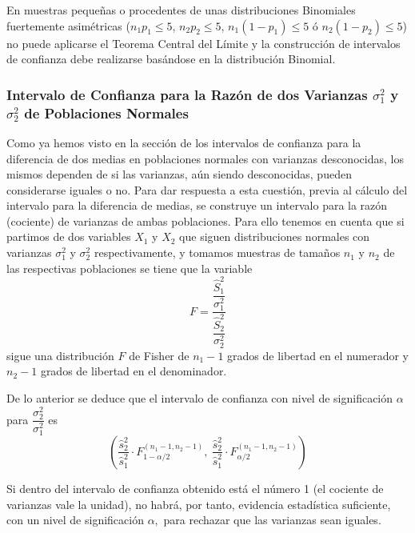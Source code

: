 En muestras pequeñas o procedentes de unas distribuciones Binomiales fuertemente asimétricas ($n_1p_1\leq 5$, $n_2p_2\leq
5$, $n_1(1-p_1)\leq 5$ ó $n_2(1-p_2)\leq 5$) no puede aplicarse el Teorema Central del Límite y la construcción de
intervalos de confianza debe realizarse basándose en la distribución Binomial.

\subsubsection{Intervalo de Confianza para la Razón de dos Varianzas $\sigma _{1}^{2}$ y $\sigma _{2}^{2}$ de
Poblaciones Normales}

Como ya hemos visto en la sección de los intervalos de confianza para la diferencia de dos medias en poblaciones normales
con varianzas desconocidas, los mismos dependen de si las varianzas, aún siendo desconocidas, pueden considerarse iguales
o no. Para dar respuesta a esta cuestión, previa al cálculo del intervalo para la diferencia de medias, se construye un
intervalo para la razón (cociente) de varianzas de ambas poblaciones. Para ello tenemos en cuenta que si partimos de dos
variables $X_{1}$ y $X_{2}$ que siguen distribuciones normales con varianzas $\sigma_{1}^{2}$ y $\sigma_{2}^{2}$
respectivamente, y tomamos muestras de tamaños $n_{1}$ y $n_{2}$ de las respectivas poblaciones se tiene que la variable
\[
F= \dfrac{\dfrac{\hat S_{1}^{2}}{\sigma_{1}^{2}}}{\dfrac{\hat S_{2}^{2}}{\sigma_{2}^{2}}}
\]
sigue una distribución $F$ de Fisher de $n_{1}-1$ grados de libertad en el numerador y $n_{2}-1$ grados de libertad en
el denominador.

De lo anterior se deduce que el intervalo de confianza con nivel de significación $\alpha$ para $\dfrac{\sigma
_{2}^{2}}{\sigma _{1}^{2}}$ es
\[
\left( \dfrac{\hat s_{2}^{2}}{\hat s_{1}^{2}}\cdot F_{1-\alpha
/2}^{\left( n_{1}-1,n_{2}-1\right) },\ \dfrac{\hat s_{2}^{2}}{
\hat s_{1}^{2}}\cdot F_{\alpha /2}^{\left(n_{1}-1,n_{2}-1\right) }\right)
\]

Si dentro del intervalo de confianza obtenido está el número 1 (el cociente de varianzas vale la unidad), no habrá, por
tanto, evidencia estadística suficiente, con un nivel de significación $\alpha ,$ para rechazar que las varianzas sean
iguales.

\clearpage
\newpage


